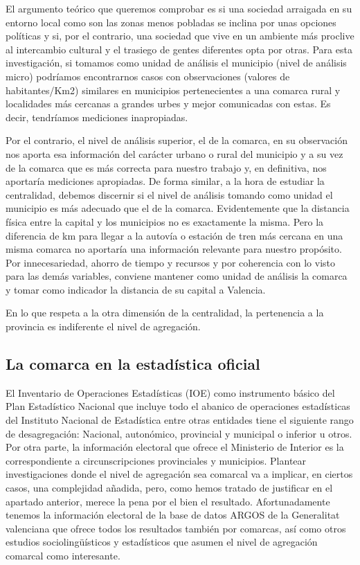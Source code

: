 \documentclass[
]{article}
\begin{document}
El argumento teórico que queremos comprobar es si una sociedad arraigada
en su entorno local como son las zonas menos pobladas se inclina por
unas opciones políticas y si, por el contrario, una sociedad que vive en
un ambiente más proclive al intercambio cultural y el trasiego de gentes
diferentes opta por otras. Para esta investigación, si tomamos como
unidad de análisis el municipio (nivel de análisis micro) podríamos
encontrarnos casos con observaciones (valores de habitantes/Km2)
similares en municipios pertenecientes a una comarca rural y localidades
más cercanas a grandes urbes y mejor comunicadas con estas. Es decir,
tendríamos mediciones inapropiadas.

Por el contrario, el nivel de análisis superior, el de la comarca, en su
observación nos aporta esa información del carácter urbano o rural del
municipio y a su vez de la comarca que es más correcta para nuestro
trabajo y, en definitiva, nos aportaría mediciones apropiadas. De forma
similar, a la hora de estudiar la centralidad, debemos discernir si el
nivel de análisis tomando como unidad el municipio es más adecuado que
el de la comarca. Evidentemente que la distancia física entre la capital
y los municipios no es exactamente la misma. Pero la diferencia de km
para llegar a la autovía o estación de tren más cercana en una misma
comarca no aportaría una información relevante para nuestro propósito.
Por innecesariedad, ahorro de tiempo y recursos y por coherencia con lo
visto para las demás variables, conviene mantener como unidad de
análisis la comarca y tomar como indicador la distancia de su capital a
Valencia.

En lo que respeta a la otra dimensión de la centralidad, la pertenencia
a la provincia es indiferente el nivel de agregación.

\hypertarget{la-comarca-en-la-estaduxedstica-oficial}{%
\subsection{La comarca en la estadística
oficial}\label{la-comarca-en-la-estaduxedstica-oficial}}

El Inventario de Operaciones Estadísticas (IOE) como instrumento básico
del Plan Estadístico Nacional que incluye todo el abanico de operaciones
estadísticas del Instituto Nacional de Estadística entre otras entidades
tiene el siguiente rango de desagregación: Nacional, autonómico,
provincial y municipal o inferior u otros. Por otra parte, la
información electoral que ofrece el Ministerio de Interior es la
correspondiente a circunscripciones provinciales y municipios. Plantear
investigaciones donde el nivel de agregación sea comarcal va a implicar,
en ciertos casos, una complejidad añadida, pero, como hemos tratado de
justificar en el apartado anterior, merece la pena por el bien el
resultado. Afortunadamente tenemos la información electoral de la base
de datos ARGOS de la Generalitat valenciana que ofrece todos los
resultados también por comarcas, así como otros estudios
sociolingüísticos y estadísticos que asumen el nivel de agregación
comarcal como interesante.
\end{document}
